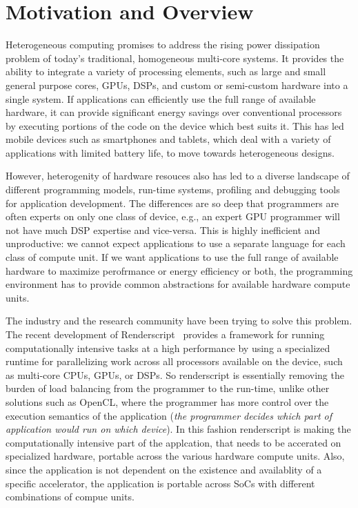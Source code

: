 \section{Motivation and Overview}
Heterogeneous computing promises to address the rising power dissipation problem
of today's traditional, homogeneous multi-core
systems. It provides the ability to integrate a variety of processing elements,
such as large and small general purpose cores, GPUs, DSPs, and custom or
semi-custom hardware into a single system. If applications can efficiently use
the full range of available hardware, it can provide significant energy
savings over conventional processors by executing portions of the code on the
device which best suits it. This has led mobile devices such as smartphones
and tablets, which deal with a variety of applications with limited battery
life, to move towards heterogeneous designs.

However, heterogenity of hardware resouces also has led to a diverse landscape
of different programming models, run-time systems, profiling and debugging tools
for application development. The differences are so deep that programmers are
often experts on only one class of device, e.g., an expert GPU programmer will
not have much DSP expertise and vice-versa. This is highly inefficient and
unproductive: we cannot expect applications to use a separate language for each
class of compute unit. If we want applications to use the full range of
available hardware to maximize perofrmance or energy efficiency or both, the
programming environment has to provide common abstractions for available
hardware compute units.

The industry and the research community have been trying to solve this problem.
The recent development of Renderscript~\cite{wiki:Renderscript, Renderscript} provides a framework
for running computationally intensive tasks at a high performance by using a
specialized runtime for 
parallelizing work across all processors available on the device, such as
multi-core CPUs, GPUs, or DSPs. So renderscript is essentially removing the
burden of load balancing from the programmer to the run-time, unlike other
solutions such as OpenCL, where the programmer has more control over the
execution semantics of the application ({\em the programmer decides which part
of application would run on which device}). In this fashion renderscript is
making the computationally intensive part of the applcation, that needs to be
accerated on specialized hardware, portable across the various hardware compute
units. Also, since the application is not dependent on the existence and
availablity of a specific accelerator, the application is portable across SoCs
with different combinations of compue units.

